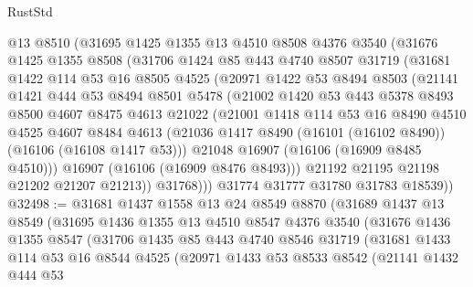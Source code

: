 \begin{lexlean}{RustStd}
\begin{coremodule}
      @13
      @8510
      (@31695
        @1425
        @1355
        @13
        @4510
        @8508
        @4376
        @3540
        (@31676
          @1425
          @1355
          @8508
          (@31706
            @1424
            @85
            @443
            @4740
            @8507
            @31719
            (@31681
              @1422
              @114
              @53
              @16
              @8505
              @4525
              (@20971
                @1422
                @53
                @8494
                @8503
                (@21141
                  @1421
                  @444
                  @53
                  @8494
                  @8501
                  @5478
                  (@21002
                    @1420
                    @53
                    @443
                    @5378
                    @8493
                    @8500
                    @4607
                    @8475
                    @4613
                    @21022
                    (@21001
                      @1418
                      @114
                      @53
                      @16
                      @8490
                      @4510
                      @4525
                      @4607
                      @8484
                      @4613
                      (@21036 @1417 @8490 (@16101 (@16102 @8490)) (@16106 (@16108 @1417 @53)))
                      @21048
                      @16907
                      (@16106 (@16909 @8485 @4510)))
                    @16907
                    (@16106 (@16909 @8476 @8493)))
                  @21192
                  @21195
                  @21198
                  @21202
                  @21207
                  @21213))
              @31768)))
        @31774
        @31777
        @31780
        @31783
        @18539))
@32498 := @31681
    @1437
    @1558
    @13
    @24
    @8549
    @8870
    (@31689
      @1437
      @13
      @8549
      (@31695
        @1436
        @1355
        @13
        @4510
        @8547
        @4376
        @3540
        (@31676
          @1436
          @1355
          @8547
          (@31706
            @1435
            @85
            @443
            @4740
            @8546
            @31719
            (@31681
              @1433
              @114
              @53
              @16
              @8544
              @4525
              (@20971
                @1433
                @53
                @8533
                @8542
                (@21141
                  @1432
                  @444
                  @53

\end{coremodule}
\end{lexlean}
